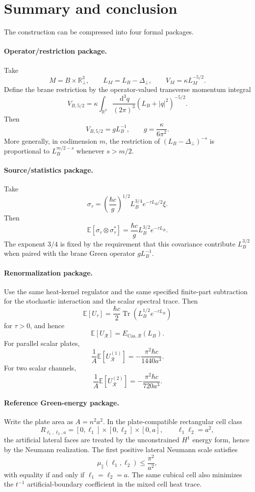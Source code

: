 \documentclass[11pt]{article}
\newcommand{\R}{\mathbb{R}}
\newcommand{\E}{\mathbb{E}}
\newcommand{\Tr}{\operatorname{Tr}}
\newcommand{\dd}{\,\mathrm{d}}
\begin{document}
\section{Summary and conclusion}
\label{sec:summary}

The construction can be compressed into four formal packages.

\paragraph{Operator/restriction package.}
Take
\[
    M=B\times\R^3_\perp,
    \qquad
    L_M=L_B-\Delta_\perp,
    \qquad
    V_M=\kappa L_M^{-5/2}.
\]
Define the brane restriction by the operator-valued transverse momentum integral
\[
    V_{B,5/2}
    =\kappa\int_{\R^3}\frac{\dd^3q}{(2\pi)^3}(L_B+|q|^2)^{-5/2}.
\]
Then
\[
    V_{B,5/2}=gL_B^{-1},
    \qquad
    g=\frac{\kappa}{6\pi^2}.
\]
More generally, in codimension $m$, the restriction of $(L_B-\Delta_\perp)^{-s}$ is proportional to $L_B^{m/2-s}$ whenever $s>m/2$.

\paragraph{Source/statistics package.}
Take
\[
    \sigma_\tau=\left(\frac{\hbar c}{g}\right)^{1/2}L_B^{3/4}e^{-\tau L_B/2}\xi.
\]
Then
\[
    \E[\sigma_\tau\otimes\sigma_\tau^*]
    =\frac{\hbar c}{g}L_B^{3/2}e^{-\tau L_B}.
\]
The exponent $3/4$ is fixed by the requirement that this covariance contribute $L_B^{3/2}$ when paired with the brane Green operator $gL_B^{-1}$.

\paragraph{Renormalization package.}
Use the same heat-kernel regulator and the same specified finite-part subtraction for the stochastic interaction and the scalar spectral trace.  Then
\[
    \E[U_\tau]
    =\frac{\hbar c}{2}\Tr(L_B^{1/2}e^{-\tau L_B})
\]
for $\tau>0$, and hence
\[
    \E[U_{\mathcal{R}}]=E_{\mathrm{Cas},\mathcal{R}}(L_B).
\]
For parallel scalar plates,
\[
    \frac{1}{A}\E[U_{\mathcal{R}}^{(1)}]
    =-\frac{\pi^2\hbar c}{1440a^3}.
\]
For two scalar channels,
\[
    \frac{1}{A}\E[U_{\mathcal{R}}^{(2)}]
    =-\frac{\pi^2\hbar c}{720a^3}.
\]


\paragraph{Reference Green-energy package.}
Write the plate area as \(A=n^2a^2\).  In the plate-compatible rectangular
cell class
\[
    R_{\ell_1,\ell_2,a}
    =
    [0,\ell_1]\times[0,\ell_2]\times[0,a],
    \qquad
    \ell_1\ell_2=a^2,
\]
the artificial lateral faces are treated by the unconstrained \(H^1\)
energy form, hence by the Neumann realization.  The first positive lateral
Neumann scale satisfies
\[
    \mu_\parallel(\ell_1,\ell_2)
    \leq
    \frac{\pi^2}{a^2},
\]
with equality if and only if \(\ell_1=\ell_2=a\).  The same cubical cell
also minimizes the \(t^{-1}\) artificial-boundary coefficient in the mixed
cell heat trace.
\end{document}
